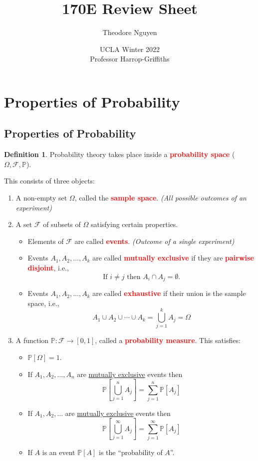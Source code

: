 \documentclass{article}
\title{170E Review Sheet}
\author{Theodore Nguyen}
\date{UCLA Winter 2022 \\ Professor Harrop-Griffiths}
\newcommand{\PP}{\mathbb{P}}
\newcommand{\bfred}[1]{\textcolor{red}{\textbf{#1}}}
\theoremstyle{plain}
\theoremstyle{definition}
\newtheorem{defn}{Definition}[section]
\theoremstyle{remark}
\begin{document}
\maketitle

\tableofcontents

\section{Properties of Probability}
\subsection{Properties of Probability}

\begin{defn}
    Probability theory takes place inside a \bfred{probability space} ($\Omega, \mathcal{F}, \PP$).

    \noindent This consists of three objects:
    \begin{enumerate}[1.]
        \item A non-empty set $\Omega$, called the \bfred{sample space}. \emph{(All possible outcomes of an experiment)}
        \item A set $\mathcal{F}$ of subsets of $\Omega$ satisfying certain properties.
        \begin{itemize}
            \item Elements of $\mathcal{F}$ are called \bfred{events}. \emph{(Outcome of a single experiment)}
            \item Events $A_1, A_2, \dotsc, A_k$ are called \bfred{mutually exclusive} if they are \bfred{pairwise disjoint}, i.e., \[\text{If $i \neq j$ then $A_i \cap A_j = \emptyset$}.\]
            \item Events $A_1, A_2, \dotsc, A_k$ are called \bfred{exhaustive} if their union is the sample space, i.e., \[A_1 \cup A_2 \cup \dotsb \cup A_k = \bigcup_{j=1}^kA_j = \Omega\]
        \end{itemize}
        \item A function $\PP: \mathcal{F} \rightarrow [0, 1]$, called a \bfred{probability measure}. This satisfies:
        \begin{itemize}
            \item $\PP[\Omega] = 1$.
            \item If $A_1, A_2, \dotsc, A_n$ are \underline{mutually exclusive} events then \[\PP\left[\bigcup_{j=1}^nA_j\right] = \sum_{j=1}^n\PP[A_j]\]
            \item If $A_1, A_2, \dotsc$ are \underline{mutually exclusive} events then \[\PP\left[\bigcup_{j=1}^\infty A_j\right] = \sum_{j=1}^\infty \PP[A_j]\]
            \item If $A$ is an event $\PP[A]$ is the ``probability of $A$''.
        \end{itemize}
    \end{enumerate}
\end{defn}
\end{document}
